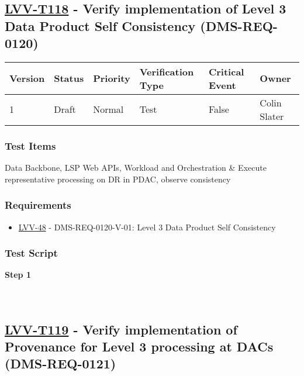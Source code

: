 \hypertarget{lvv-t118---verify-implementation-of-level-3-data-product-self-consistency-dms-req-0120}{%
\subsection{\texorpdfstring{\href{https://jira.lsstcorp.org/secure/Tests.jspa\#/testCase/LVV-T118}{LVV-T118}
- Verify implementation of Level 3 Data Product Self Consistency
(DMS-REQ-0120)}{LVV-T118 - Verify implementation of Level 3 Data Product Self Consistency (DMS-REQ-0120)}}\label{lvv-t118---verify-implementation-of-level-3-data-product-self-consistency-dms-req-0120}}

\begin{longtable}[]{@{}llllll@{}}
\toprule
Version & Status & Priority & Verification Type & Critical Event &
Owner\tabularnewline
\midrule
\endhead
1 & Draft & Normal & Test & False & Colin Slater\tabularnewline
\bottomrule
\end{longtable}

\hypertarget{test-items-18}{%
\subsubsection{Test Items}\label{test-items-18}}

Data Backbone, LSP Web APIs, Workload and Orchestration \& Execute
representative processing on DR in PDAC, observe consistency

\hypertarget{requirements-18}{%
\subsubsection{Requirements}\label{requirements-18}}

\begin{itemize}
\tightlist
\item
  \href{https://jira.lsstcorp.org/browse/LVV-48}{LVV-48} -
  DMS-REQ-0120-V-01: Level 3 Data Product Self Consistency
\end{itemize}

\hypertarget{test-script-18}{%
\subsubsection{Test Script}\label{test-script-18}}

\textbf{Step 1}\\
~\\
~\\

\hypertarget{lvv-t119---verify-implementation-of-provenance-for-level-3-processing-at-dacs-dms-req-0121}{%
\subsection{\texorpdfstring{\href{https://jira.lsstcorp.org/secure/Tests.jspa\#/testCase/LVV-T119}{LVV-T119}
- Verify implementation of Provenance for Level 3 processing at DACs
(DMS-REQ-0121)}{LVV-T119 - Verify implementation of Provenance for Level 3 processing at DACs (DMS-REQ-0121)}}\label{lvv-t119---verify-implementation-of-provenance-for-level-3-processing-at-dacs-dms-req-0121}}

